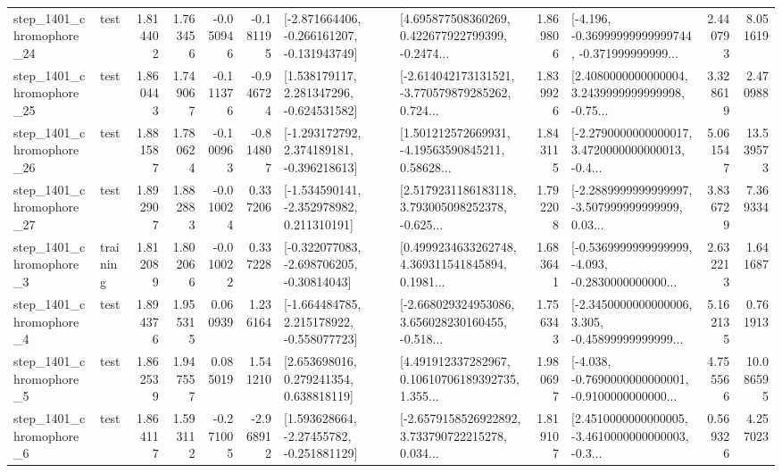 \begin{tabular}{llrrrrllrlrr}
 step\_1401\_chromophore\_24 &      test &      1.814402 &    1.763456 &     -0.050946 & -0.181195 &  [-2.871664406, -0.266161207, -0.131943749] &  [4.695877508360269, 0.422677922799399, -0.2474... &       1.869806 &  [-4.196, -0.36999999999999744, -0.371999999999... &            2.440793 &          8.051619 \\
 step\_1401\_chromophore\_25 &      test &      1.860443 &    1.749067 &     -0.111376 & -0.946724 &    [1.538179117, 2.281347296, -0.624531582] &  [-2.614042173131521, -3.770579879285262, 0.724... &       1.839926 &  [2.4080000000000004, 3.2439999999999998, -0.75... &            3.328619 &          2.470988 \\
 step\_1401\_chromophore\_26 &      test &      1.881587 &    1.780624 &     -0.100963 & -0.814807 &   [-1.293172792, 2.374189181, -0.396218613] &  [1.501212572669931, -4.19563590845211, 0.58628... &       1.843115 &  [-2.2790000000000017, 3.4720000000000013, -0.4... &            5.061547 &         13.539573 \\
 step\_1401\_chromophore\_27 &      test &      1.892907 &    1.882883 &     -0.010024 &  0.337206 &   [-1.534590141, -2.352978982, 0.211310191] &  [2.5179231186183118, 3.793005098252378, -0.625... &       1.792208 &  [-2.2889999999999997, -3.507999999999999, 0.03... &            3.836729 &          7.369334 \\
  step\_1401\_chromophore\_3 &  training &      1.812089 &    1.802066 &     -0.010022 &  0.337228 &   [-0.322077083, -2.698706205, -0.30814043] &  [0.4999234633262748, 4.369311541845894, 0.1981... &       1.683641 &  [-0.5369999999999999, -4.093, -0.2830000000000... &            2.632213 &          1.641687 \\
  step\_1401\_chromophore\_4 &      test &      1.894376 &    1.955315 &      0.060939 &  1.236164 &   [-1.664484785, 2.215178922, -0.558077723] &  [-2.668029324953086, 3.656028230160455, -0.518... &       1.756343 &  [-2.3450000000000006, 3.305, -0.45899999999999... &            5.162135 &          0.761913 \\
  step\_1401\_chromophore\_5 &      test &      1.862539 &    1.947557 &      0.085019 &  1.541210 &     [2.653698016, 0.279241354, 0.638818119] &  [4.491912337282967, 0.10610706189392735, 1.355... &       1.980697 &  [-4.038, -0.7690000000000001, -0.9100000000000... &            4.755566 &         10.086595 \\
  step\_1401\_chromophore\_6 &      test &      1.864117 &    1.593112 &     -0.271005 & -2.968912 &    [1.593628664, -2.27455782, -0.251881129] &  [-2.6579158526922892, 3.733790722215278, 0.034... &       1.819107 &  [2.4510000000000005, -3.4610000000000003, -0.3... &            0.569326 &          4.257023 \\

\end{tabular}
